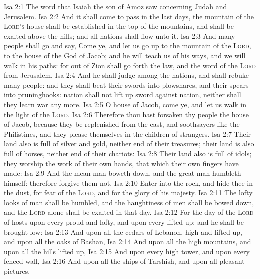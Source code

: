 \vs Isa 2:1 The word that Isaiah the son of Amoz saw concerning Judah and Jerusalem.
\vs Isa 2:2 And it shall come to pass in the last days,  the mountain of the \textsc{Lord's} house shall be established in the top of the mountains, and shall be exalted above the hills; and all nations shall flow unto it.
\vs Isa 2:3 And many people shall go and say, Come ye, and let us go up to the mountain of the \textsc{Lord}, to the house of the God of Jacob; and he will teach us of his ways, and we will walk in his paths: for out of Zion shall go forth the law, and the word of the \textsc{Lord} from Jerusalem.
\vs Isa 2:4 And he shall judge among the nations, and shall rebuke many people: and they shall beat their swords into plowshares, and their spears into pruninghooks: nation shall not lift up sword against nation, neither shall they learn war any more.
\vs Isa 2:5 O house of Jacob, come ye, and let us walk in the light of the \textsc{Lord}.
\vs Isa 2:6 Therefore thou hast forsaken thy people the house of Jacob, because they be replenished from the east, and  soothsayers like the Philistines, and they please themselves in the children of strangers.
\vs Isa 2:7 Their land also is full of silver and gold, neither  end of their treasures; their land is also full of horses, neither  end of their chariots:
\vs Isa 2:8 Their land also is full of idols; they worship the work of their own hands, that which their own fingers have made:
\vs Isa 2:9 And the mean man boweth down, and the great man humbleth himself: therefore forgive them not.
\vs Isa 2:10 Enter into the rock, and hide thee in the dust, for fear of the \textsc{Lord}, and for the glory of his majesty.
\vs Isa 2:11 The lofty looks of man shall be humbled, and the haughtiness of men shall be bowed down, and the \textsc{Lord} alone shall be exalted in that day.
\vs Isa 2:12 For the day of the \textsc{Lord} of hosts  upon every  proud and lofty, and upon every  lifted up; and he shall be brought low:
\vs Isa 2:13 And upon all the cedars of Lebanon,  high and lifted up, and upon all the oaks of Bashan,
\vs Isa 2:14 And upon all the high mountains, and upon all the hills  lifted up,
\vs Isa 2:15 And upon every high tower, and upon every fenced wall,
\vs Isa 2:16 And upon all the ships of Tarshish, and upon all pleasant pictures.
